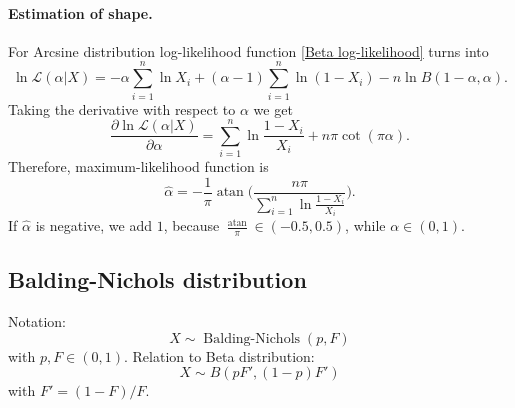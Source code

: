 \documentclass[a4paper,11pt]{article}
\theoremstyle{plain}
\theoremstyle{definition}
\begin{document}
	\paragraph{Estimation of shape.} For Arcsine distribution log-likelihood function \eqref{Beta log-likelihood} turns into
	\[
	\ln \mathcal{L} (\alpha | X) = -\alpha \sum_{i=1}^{n} \ln X_i + (\alpha - 1) \sum_{i=1}^{n}\ln (1-X_i) - n \ln B(1-\alpha, \alpha).
	\]
	Taking the derivative with respect to $\alpha$ we get
	\[ 
	\frac{\partial \ln\mathcal{L}(\alpha | X)}{\partial \alpha} = \sum_{i=1}^{n} \ln \frac{1-X_i}{X_i} + n\pi \cot(\pi \alpha).
	\]
	Therefore, maximum-likelihood function is
	\[ \hat{\alpha} = -\frac{1}{\pi} \operatorname{atan}\Bigg(\frac{n\pi}{\sum_{i=1}^{n} \ln \frac{1-X_i}{X_i}}\Bigg). \]
	If $\hat{\alpha}$ is negative, we add $1$, because $\frac{\operatorname{atan}}{\pi} \in (-0.5, 0.5)$, while $\alpha \in (0, 1)$.
	
	\subsection{Balding-Nichols distribution}
	Notation: \[ X \sim \operatorname{Balding-Nichols}(p, F) \] with $p, F \in (0, 1)$.
	Relation to Beta distribution: \[ X \sim B(pF', (1 - p)F') \] with $F' = (1 - F) / F$.
	
\end{document}
